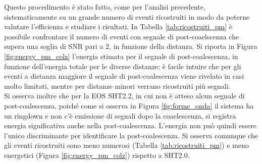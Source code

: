 Questo procedimento è stato fatto, come per l'analisi precedente, sistematicamente su un grande numero di eventi ricostruiti in modo da poterne valutare l'efficienza e studiare i risultati. In Tabella \ref{tab:ricostruiti_pm} è possibile confrontare il numero di eventi con segnale di post-coaelscenza che supera una soglia di SNR pari a 2, in funzione della distanza. Si riporta in Figura \ref{fig:energy_pm_colz} l'energia stimata per il segnale di post-coalescenza, in funzione dell'energia totale per le diverse distanze: è facile intuire che per gli eventi a distanza maggiore il segnale di post-coalescenza viene rivelato in casi molto limitati, mentre per distanze minori verrano ricostruiti più segnali.\\
Si osserva inoltre che per la EOS SHT2.2, in cui non è atteso alcun segnale di post-coalescenza, poiché come si osserva in Figura \ref{fig:forme_onda} il sistema ha un ringdown e non c'è emissione di segnali dopo la coaelescenza, si registra energia significativa anche nella post-coalescenza. L'energia non può quindi essere l'unico discriminante per identificare la post-coalescenza. Si osserva comunque che gli eventi ricostruiti sono meno numerosi (Tabella \ref{tab:ricostruiti_pm}) e meno energetici (Figura \ref{fig:energy_pm_colz}) rispetto a SHT2.0.
